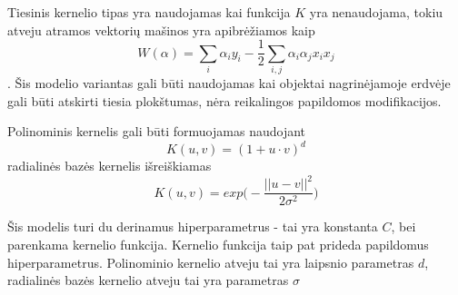 Tiesinis kernelio tipas yra naudojamas kai funkcija $K$ yra nenaudojama, tokiu atveju atramos vektorių mašinos yra apibrėžiamos kaip
\begin{equation}
    W(\alpha) = \sum_{i}\alpha_i y_i - \frac{1}{2} \sum_{i, j} \alpha_i \alpha_j x_i x_j
\end{equation}.
Šis modelio variantas gali būti naudojamas kai objektai nagrinėjamoje erdvėje gali būti atskirti tiesia plokštumas, nėra reikalingos papildomos modifikacijos.

Polinominis kernelis gali būti formuojamas naudojant \cite{vw}
\begin{equation}
    K(u, v) = (1 + u \cdot v)^d
\end{equation}
radialinės bazės kernelis išreiškiamas
\begin{equation}
    K(u, v) = exp \big( - \frac{|| u - v ||^2}{2 \sigma ^ 2} \big)
\end{equation}

Šis modelis turi du derinamus hiperparametrus - tai yra konstanta $C$, bei parenkama kernelio funkcija. Kernelio funkcija taip pat prideda papildomus hiperparametrus. Polinominio kernelio atveju tai yra laipsnio parametras $d$, radialinės bazės kernelio atveju tai yra parametras $\sigma$